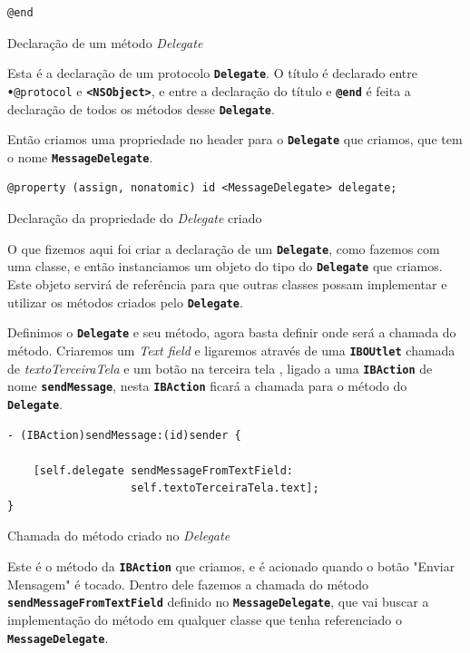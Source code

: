 \documentclass[a4paper,12pt,brazil,doubleside]{book}
\begin{document}
\begin{singlespace}
\begin{listing}[H]
\begin{verbatim}
@end
\end{verbatim}
\caption{Declaração de um método \emph{Delegate}}
\end{listing}


Esta é a declaração de um protocolo \texttt{\textbf{Delegate}}. O título é declarado entre \texttt{\textbf{•}{@protocol}} e \texttt{\textbf{<NSObject>}}, e entre a declaração do título e \texttt{\textbf{@end}} é feita a declaração de todos os métodos desse \texttt{\textbf{Delegate}}.

Então criamos uma propriedade no header para o \texttt{\textbf{Delegate}} que criamos, que tem o nome \texttt{\textbf{MessageDelegate}}.

\begin{listing}[H]
\begin{verbatim}
@property (assign, nonatomic) id <MessageDelegate> delegate;
\end{verbatim}
\caption{Declaração da propriedade do \emph{Delegate} criado}
\end{listing}


O que fizemos aqui foi criar a declaração de um \texttt{\textbf{Delegate}}, como fazemos com uma classe, e então instanciamos um objeto do tipo do \texttt{\textbf{Delegate}} que criamos. Este objeto servirá de referência para que outras classes possam implementar e utilizar os métodos criados pelo \texttt{\textbf{Delegate}}.

Definimos o \texttt{\textbf{Delegate}} e seu método, agora basta definir onde será a chamada do método. Criaremos um \emph{Text field} e ligaremos através de uma \texttt{\textbf{IBOUtlet}} chamada de \emph{textoTerceiraTela} e um botão na terceira tela , ligado a uma \texttt{\textbf{IBAction}} de nome \texttt{\textbf{sendMessage}}, nesta \texttt{\textbf{IBAction}} ficará a chamada para o método do \texttt{\textbf{Delegate}}.

\begin{listing}
\begin{verbatim}
- (IBAction)sendMessage:(id)sender {
    
    [self.delegate sendMessageFromTextField:
                   self.textoTerceiraTela.text];
}
\end{verbatim}
\caption{Chamada do método criado no \emph{Delegate}}
\end{listing}

Este é o método da \texttt{\textbf{IBAction}} que criamos, e é acionado quando o botão "Enviar Mensagem" é tocado. Dentro dele fazemos a chamada do método \texttt{\textbf{sendMessageFromTextField}} definido no \texttt{\textbf{MessageDelegate}}, que vai buscar a implementação do método em qualquer classe que tenha referenciado o \texttt{\textbf{MessageDelegate}}.


\end{singlespace}
\end{document}
